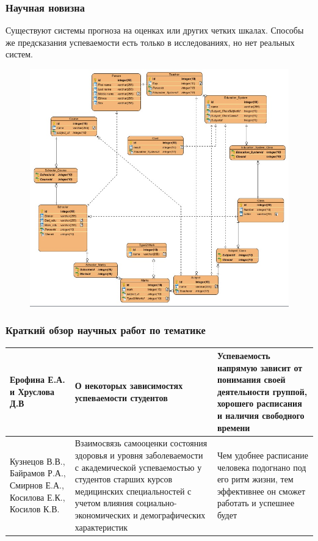 \documentclass[
	fullscreen=true, 
	bookmarks=false,
	sans serif,
	9pt,
	pdf,
	hyperref={
		pdfpagelabels=false,
		unicode=true
	}
]{beamer}
\begin{document}
	\begin{frame}\frametitle{Научная новизна}
		Существуют системы прогноза на оценках или других четких шкалах. Способы же предсказания успеваемости есть только в исследованиях, но нет реальных систем.
		\begin{figure}
			\centering
			\includegraphics[width=0.5\linewidth]{images/student}
		\end{figure}
	\end{frame}

	\begin{frame}\frametitle{Краткий обзор научных работ по тематике}
		\begin{tabular}{|p{2cm}|p{4.3cm}|p{4.3cm}|}
			\hline 
			Ерофина Е.А. и Хруслова Д.В  & О некоторых зависимостях успеваемости студентов & Успеваемость напрямую зависит от понимания своей деятельности группой, хорошего расписания и наличия свободного времени \\ 
			\hline 
			Кузнецов В.В., Байрамов Р.А., Смирнов Е.А., Косилова Е.К., Косилов К.В. & Взаимосвязь самооценки состояния здоровья и уровня заболеваемости с академической успеваемостью у студентов старших курсов медицинских специальностей с учетом влияния социально-экономических и демографических характеристик & Чем удобнее расписание человека подогнано под его ритм жизни, тем эффективнее он сможет работать и успешнее будет \\ 
			\hline 
		\end{tabular}		
	\end{frame}
\end{document}
